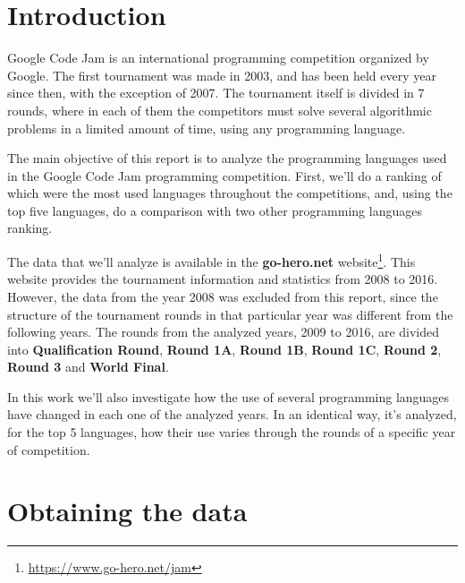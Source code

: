 \documentclass{article}
\begin{document}
\begin{multicols*}{2}


\section{Introduction}
Google Code Jam is an international programming competition\cite{gcj} organized by Google. The first tournament was made in 2003, and has been held every year since then, with the exception of 2007. The tournament itself is divided in 7 rounds, where in each of them the competitors must solve several algorithmic problems in a limited amount of time, using any programming language.

The main objective of this report is to analyze the programming languages used in the Google Code Jam programming competition. First, we'll do a ranking of which were the most used languages throughout the competitions, and, using the top five languages, do a comparison with two other programming languages ranking.

The data that we'll analyze is available in the \textbf{go-hero.net} website\footnote{\url{https://www.go-hero.net/jam}}. This website provides the tournament information\cite{go-hero} and statistics from 2008 to 2016. However, the data from the year 2008 was excluded from this report, since the structure of the tournament rounds in that particular year was different from the following years. The rounds from the analyzed years, 2009 to 2016, are divided into \textbf{Qualification Round}, \textbf{Round 1A}, \textbf{Round 1B}, \textbf{Round 1C}, \textbf{Round 2}, \textbf{Round 3} and \textbf{World Final}.

In this work we'll also investigate how the use of several programming languages have changed in each one of the analyzed years. In an identical way, it's analyzed, for the top 5 languages, how their use varies through the rounds of a specific year of competition.



\section{Obtaining the data}


\end{multicols*}
\end{document}
